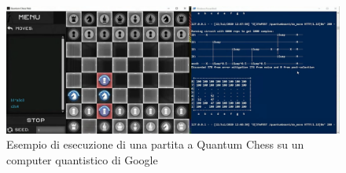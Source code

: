 \documentclass{book}
\theoremstyle{definition}
\theoremstyle{definition}
\theoremstyle{definition}
\theoremstyle{plain}
\theoremstyle{plain}
\theoremstyle{plain}
\theoremstyle{plain}
\begin{document}
\begin{figure}[h!]
\captionsetup{font=scriptsize}
\begin{center}
    \includegraphics[width=1\textwidth]{Immagini troppo complicate/quantum_chess_google.png}
\end{center}
\caption{\scriptsize Esempio di esecuzione di una partita a Quantum Chess su un computer quantistico di Google\cite{quantum_chess_demonstration}}\label{fig:img_chess_quantum_google}
\end{figure}
\end{document}
